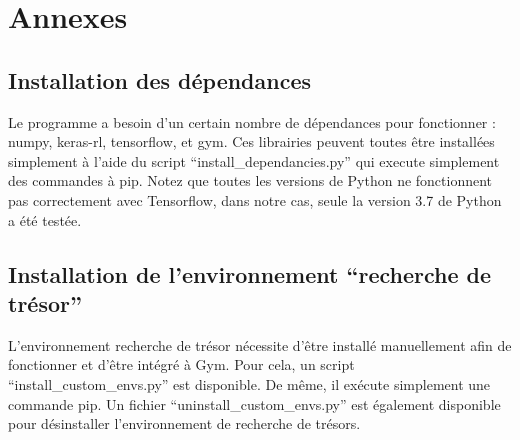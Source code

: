 \chapter*{Annexes}

\section*{Installation des dépendances}
Le programme a besoin d'un certain nombre de dépendances pour fonctionner : numpy, keras-rl, tensorflow, et gym. Ces librairies peuvent toutes être installées simplement à l'aide du script ``install\_dependancies.py'' qui execute simplement des commandes à pip.
Notez que toutes les versions de Python ne fonctionnent pas correctement avec Tensorflow, dans notre cas, seule la version 3.7 de Python a été testée.

\section*{Installation de l'environnement ``recherche de trésor''}
L'environnement recherche de trésor nécessite d'être installé manuellement afin de fonctionner et d'être intégré à Gym. Pour cela, un script ``install\_custom\_envs.py'' est disponible. De même, il exécute simplement une commande pip. Un fichier ``uninstall\_custom\_envs.py'' est également disponible pour désinstaller l'environnement de recherche de trésors.